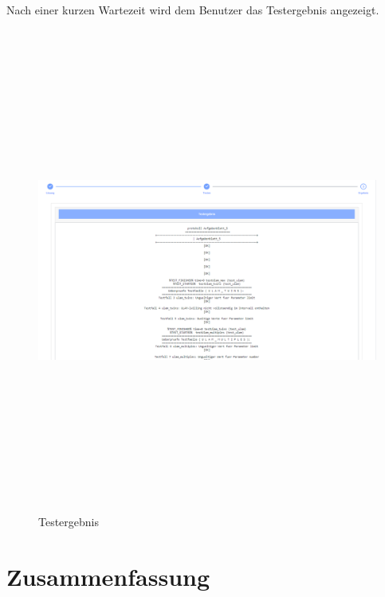\documentclass[a4paper,12pt,oneside]{book}
\begin{document}
\newpage
Nach einer kurzen Wartezeit wird dem Benutzer das Testergebnis angezeigt.
\begin{figure}[h!]
	\begin{center}
		\includegraphics[width=16cm, height=16cm]{Testergebnis.PNG}
		\caption{Testergebnis} 
		\label{Testergebnis} 
	\end{center}
\end{figure}
\chapter{Zusammenfassung}
\begin{thebibliography}{9}
\end{thebibliography}
\end{document}
